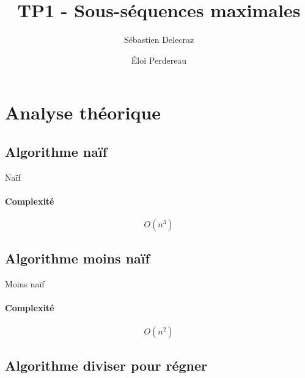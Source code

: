 \documentclass[11pt, a4paper]{article}
\title{TP1 - Sous-séquences maximales}
\author{Sébastien Delecraz \and \'Eloi Perdereau}
\begin{document}
\maketitle

\section{Analyse théorique}

\subsection{Algorithme naïf}

\begin{algorithm}
\caption{Naïf}
\end{algorithm}
\paragraph{Complexité}
\[O(n^3)\]

\subsection{Algorithme moins naïf}

\begin{algorithm}
\caption{Moins naïf}
\end{algorithm}
\paragraph{Complexité}
\[O(n^2)\]

\subsection{Algorithme diviser pour régner}
\end{document}
